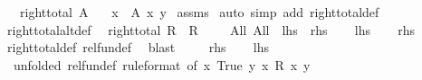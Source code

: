\begin{isabellebody}
\ \ \ {\isachardoublequoteopen}right{\isacharunderscore}{\kern0pt}total\ A{\isachardoublequoteclose}\isanewline
\ \ \ x\ \ {\isachardoublequoteopen}A\ x\ y{\isachardoublequoteclose}\isanewline
%
\isadelimproof
%
\endisadelimproof
%
\isatagproof
{}\isamarkupfalse%
\ assms\ \isamarkupfalse%
{\isacharparenleft}{\kern0pt}auto\ simp\ add{\isacharcolon}{\kern0pt}\ right{\isacharunderscore}{\kern0pt}total{\isacharunderscore}{\kern0pt}def{\isacharparenright}{\kern0pt}%
\endisatagproof
{\isafoldproof}%
%
\isadelimproof
\isanewline
%
\endisadelimproof
\isanewline
{}\isamarkupfalse%
\ right{\isacharunderscore}{\kern0pt}total{\isacharunderscore}{\kern0pt}alt{\isacharunderscore}{\kern0pt}def{}{\isacharcolon}{\kern0pt}\isanewline
\ \ {\isachardoublequoteopen}right{\isacharunderscore}{\kern0pt}total\ R\ {\isasymlongleftrightarrow}\ {\isacharparenleft}{\kern0pt}{\isacharparenleft}{\kern0pt}R\ {\isacharequal}{\kern0pt}{\isacharequal}{\kern0pt}{\isacharequal}{\kern0pt}{\isachargreater}{\kern0pt}\ {\isacharparenleft}{\kern0pt}{\isasymlongrightarrow}{\isacharparenright}{\kern0pt}{\isacharparenright}{\kern0pt}\ {\isacharequal}{\kern0pt}{\isacharequal}{\kern0pt}{\isacharequal}{\kern0pt}{\isachargreater}{\kern0pt}\ {\isacharparenleft}{\kern0pt}{\isasymlongrightarrow}{\isacharparenright}{\kern0pt}{\isacharparenright}{\kern0pt}\ All\ All{\isachardoublequoteclose}\ {\isacharparenleft}{\kern0pt}\ {\isachardoublequoteopen}{\isacharquery}{\kern0pt}lhs\ {\isacharequal}{\kern0pt}\ {\isacharquery}{\kern0pt}rhs{\isachardoublequoteclose}{\isacharparenright}{\kern0pt}\isanewline
%
\isadelimproof
%
\endisadelimproof
%
\isatagproof
{}\isamarkupfalse%
\isanewline
\ \ \isamarkupfalse%
\ {\isacharquery}{\kern0pt}lhs\ \isamarkupfalse%
\ \isamarkupfalse%
\ {\isacharquery}{\kern0pt}rhs\isanewline
\ \ \ \ \isamarkupfalse%
\ right{\isacharunderscore}{\kern0pt}total{\isacharunderscore}{\kern0pt}def\ rel{\isacharunderscore}{\kern0pt}fun{\isacharunderscore}{\kern0pt}def\ \isamarkupfalse%
\ blast\isanewline
{}\isamarkupfalse%
\isanewline
\ \ \isamarkupfalse%
\ {\isasymsection}{\isacharcolon}{\kern0pt}\ {\isacharquery}{\kern0pt}rhs\isanewline
\ \ \isamarkupfalse%
\ {\isacharquery}{\kern0pt}lhs\isanewline
\ \ \ \ \isamarkupfalse%
\ {\isasymsection}\ {\isacharbrackleft}{\kern0pt}unfolded\ rel{\isacharunderscore}{\kern0pt}fun{\isacharunderscore}{\kern0pt}def{\isacharcomma}{\kern0pt}\ rule{\isacharunderscore}{\kern0pt}format{\isacharcomma}{\kern0pt}\ of\ {\isachardoublequoteopen}{\isasymlambda}x{\isachardot}{\kern0pt}\ True{\isachardoublequoteclose}\ {\isachardoublequoteopen}{\isasymlambda}y{\isachardot}{\kern0pt}\ {\isasymexists}x{\isachardot}{\kern0pt}\ R\ x\ y{\isachardoublequoteclose}{\isacharbrackright}{\kern0pt}\isanewline

\end{isabellebody}
